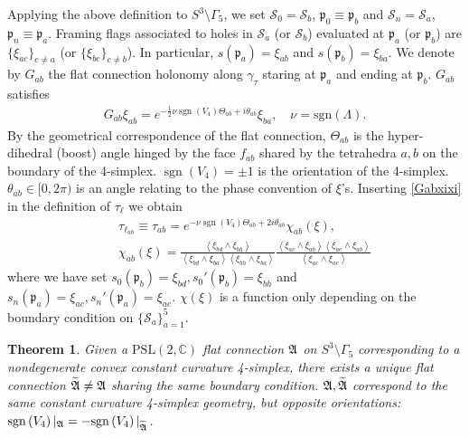\documentclass[aps,prd,notitlepage,nofootinbib,superscriptaddress,groupedaddress,twocolumn]{revtex4-1}
\def\sgn{\text{sgn}}
\newtheorem{theorem}{Theorem}[section]
\newcommand{\PSlc}{\mathrm{PSL}(2,\mathbb{C})}
\def\be{\begin{eqnarray}}
\def\ee{\end{eqnarray}}
\newcommand{\cs}{\mathcal S}
\newcommand{\fp}{\mathfrak{p}}  \newcommand{\Fp}{\mathfrak{P}}
\newcommand{\g}{\gamma}
\newcommand{\G}{\Gamma}
\renewcommand{\L }{\Lambda}
\renewcommand{\t}{\tau}
\begin{document}
Applying the above definition to $S^3\setminus\G_5$, we set $\cs_0=\cs_b$, $\fp_0\equiv \fp_b$ and $\cs_n=\cs_a$, $\fp_n\equiv\fp_a$. Framing flags associated to holes in $\cs_a$ (or $\cs_b$) evaluated at $\fp_a$ (or $\fp_b$) are $\{\xi_{ac}\}_{c\neq a}$ (or $\{\xi_{bc}\}_{c\neq b}$). In particular, $s(\fp_a)=\xi_{ab}$ and $s(\fp_{b})=\xi_{ba}$. We denote by $G_{ab}$ the flat connection holonomy along $\g_\t$ staring at $\fp_a$ and ending at $\fp_b$. $G_{ab}$ satisfies \cite{HHKR,3dblockHHKR,hanSUSY}
\be
G_{ab} \xi_{ab}=e^{-\frac{1}{2} \nu \operatorname{sgn}\left(V_{4}\right)  \Theta_{ab}+i\theta_{ab}} \xi_{ba},\quad \nu=\sgn(\L).\label{Gabxixi}
\ee
By the geometrical correspondence of the flat connection, $\Theta_{ab}$ is the hyper-dihedral (boost) angle hinged by the face $f_{ab}$ shared by the tetrahedra $a,b$ on the boundary of the 4-simplex. $\operatorname{sgn}\left(V_{4}\right)=\pm 1$ is the orientation of the 4-simplex. $\theta_{ab}\in[0,2\pi)$ is an angle relating to the phase convention of $\xi$'s. Inserting \eqref{Gabxixi} in the definition of $\t_\ell$ we obtain
\be
&&\t_{\ell_{ab}}\equiv\t_{ab}=e^{- \nu\operatorname{sgn}\left(V_{4}\right)  \Theta_{ab}+2i\theta_{ab}}\chi_{ab}(\xi),\\
&&\chi_{a b}(\xi)=\frac{\left\langle\xi_{b d} \wedge \xi_{b h}\right\rangle}{\left\langle\xi_{b d} \wedge \xi_{b a}\right\rangle\left\langle\xi_{b h} \wedge \xi_{b a}\right\rangle} \frac{\left\langle\xi_{a c} \wedge \xi_{a b}\right\rangle\left\langle\xi_{a e} \wedge \xi_{a b}\right\rangle}{\left\langle\xi_{a c} \wedge \xi_{a e}\right\rangle}\nonumber
\ee
where we have set $s_0(\fp_b)=\xi_{bd}, s_0'(\fp_b)=\xi_{bh}$ and $s_n(\fp_a)=\xi_{ac}, s_n'(\fp_a)=\xi_{ae}$. $\chi(\xi)$ is a function only depending on the boundary condition on $\{\cs_a\}_{a=1}^5$.


\begin{theorem}

	Given a $\PSlc$ flat connection $\mathfrak{A}$ on $S^3\setminus\G_5$ corresponding to a nondegenerate convex constant curvature 4-simplex, there exists a unique flat connection $\widetilde{\mathfrak{A}}\neq \mathfrak{A}$ sharing the same boundary condition. $\mathfrak{A},\widetilde{\mathfrak{A}}$ correspond to the same constant curvature 4-simplex geometry, but opposite orientations: $\mathrm{sgn}\left(V_{4}\right)|_{\mathfrak{A}}=-\mathrm{sgn}\left(V_{4}\right)|_{\widetilde {\mathfrak{A}}}$. 

\end{theorem}
\end{document}
